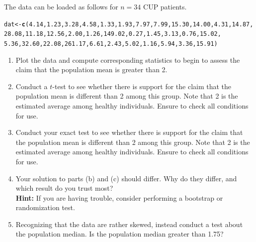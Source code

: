 \documentclass{article}\usepackage[]{graphicx}\usepackage[]{xcolor}
\makeatletter
\newcommand{\hlnum}[1]{\textcolor[rgb]{0.686,0.059,0.569}{#1}}%
\newcommand{\hldef}[1]{\textcolor[rgb]{0.345,0.345,0.345}{#1}}%
\newcommand{\hlkwb}[1]{\textcolor[rgb]{0.69,0.353,0.396}{#1}}%
\newcommand{\hlkwd}[1]{\textcolor[rgb]{0.737,0.353,0.396}{\textbf{#1}}}%
\newenvironment{kframe}{%
 \def\at@end@of@kframe{}%
 \ifinner\ifhmode%
  \def\at@end@of@kframe{\end{minipage}}%
  \begin{minipage}{\columnwidth}%
 \fi\fi%
 \def\FrameCommand##1{\hskip\@totalleftmargin \hskip-\fboxsep
 \colorbox{shadecolor}{##1}\hskip-\fboxsep
     \hskip-\linewidth \hskip-\@totalleftmargin \hskip\columnwidth}%
 \MakeFramed {\advance\hsize-\width
   \@totalleftmargin\z@ \linewidth\hsize
   \@setminipage}}%
 {\par\unskip\endMakeFramed%
 \at@end@of@kframe}
\newenvironment{knitrout}{}{} %
\makeatother
\begin{document}
\begin{enumerate}
  The data can be loaded as follows for $n=34$ CUP patients.
\begin{knitrout}\scriptsize
{}\color{fgcolor}\begin{kframe}
\begin{alltt}
\hldef{dat} \hlkwb{<-} \hlkwd{c}\hldef{(}\hlnum{4.14}\hldef{,} \hlnum{1.23}\hldef{,} \hlnum{3.28}\hldef{,} \hlnum{4.58}\hldef{,} \hlnum{1.33}\hldef{,} \hlnum{1.93}\hldef{,} \hlnum{7.97}\hldef{,} \hlnum{7.99}\hldef{,} \hlnum{15.30}\hldef{,} \hlnum{14.00}\hldef{,} \hlnum{4.31}\hldef{,} \hlnum{14.87}\hldef{,}
         \hlnum{28.08}\hldef{,} \hlnum{11.18}\hldef{,} \hlnum{12.56}\hldef{,} \hlnum{2.00}\hldef{,} \hlnum{1.26}\hldef{,} \hlnum{149.02}\hldef{,} \hlnum{0.27}\hldef{,} \hlnum{1.45}\hldef{,} \hlnum{3.13}\hldef{,} \hlnum{0.76}\hldef{,} \hlnum{15.02}\hldef{,}
         \hlnum{5.36}\hldef{,} \hlnum{32.60}\hldef{,} \hlnum{22.08}\hldef{,} \hlnum{261.17}\hldef{,} \hlnum{6.61}\hldef{,} \hlnum{2.43}\hldef{,} \hlnum{5.02}\hldef{,} \hlnum{1.16}\hldef{,} \hlnum{5.94}\hldef{,} \hlnum{3.36}\hldef{,} \hlnum{15.91}\hldef{)}
\end{alltt}
\end{kframe}
\end{knitrout}
  \begin{enumerate}
    \item Plot the data and compute corresponding statistics to begin to assess
    the claim that the population mean is greater than 2.
    \item Conduct a $t$-test to see whether there is support for the claim that 
    the population mean is different than 2 among this group. Note that 2 is the 
    estimated average among healthy individuals. Ensure to check all conditions
    for use.
    \item Conduct your exact test to see whether there is support for the claim 
    that the population mean is different than 2 among this group. Note that 2 is 
    the estimated average among healthy individuals. Ensure to check all conditions
    for use.
    \item Your solution to parts (b) and (c) should differ. Why do they differ,
    and which result do you trust most?\\
    \textbf{Hint:} If you are having trouble, consider performing a bootstrap
    or randomization test.
    \item Recognizing that the data are rather skewed, instead conduct a test about the
    population median. Is the population median greater than 1.75?
  \end{enumerate}
\end{enumerate}

\end{document}
